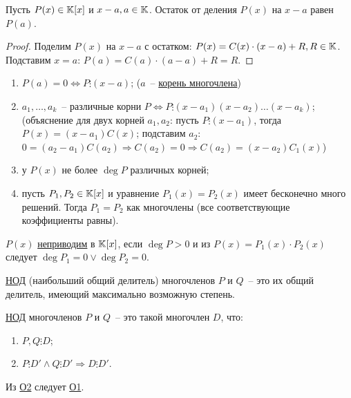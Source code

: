 \begin{theo}[Безу]
	Пусть $P(x) \in \mathbb{K}[x]$ и $x-a, a \in \mathbb{K}$. Остаток от деления $P(x)$ на $x-a$ равен $P(a)$.
\end{theo}
\begin{proof}
	Поделим $P(x)$ на $x-a$ с остатком: $P(x)=C(x) \cdot (x-a) + R, R \in \mathbb{K}$. Подставим $x=a$: $P(a)=C(a) \cdot (a-a) + R = R$.
\end{proof}
\begin{cor}
	\begin{enumerate}
		\item $P(a)=0 \Leftrightarrow P \vdots (x-a)$; ($a$~-- \underline{корень многочлена})
		\item $a_1, \ldots, a_k$~-- различные корни $P \Leftrightarrow P \vdots (x-a_{1})(x-a_{2}) \ldots (x-a_{k})$; (объяснение для двух корней $a_1, a_2$: пусть $P \vdots (x-a_1)$, тогда $P(x)=(x-a_1)C(x)$; подставим $a_2$: $0=(a_2-a_1)C(a_2) \Rightarrow C(a_2)=0 \Rightarrow C(a_2)=(x-a_2)C_1(x)$)
		\item у $P(x)$ не более $\deg P$ различных корней;
		\item пусть $P_1, P_2 \in \mathbb{K}[x]$ и уравнение $P_1(x)=P_2(x)$ имеет бесконечно много решений. Тогда $P_1=P_2$ как многочлены (все соответствующие коэффициенты равны).
	\end{enumerate}
\end{cor}

\begin{defin}
	$P(x)$ \underline{неприводим} в $\mathbb{K}[x]$, если $\deg P > 0$ и из $P(x)=P_1(x) \cdot P_2(x)$ следует $\deg P_1 = 0 \lor \deg P_2 = 0$.
\end{defin}

\label{GCD_def1}\begin{defin}[О1]
	\underline{НОД} (наибольший общий делитель) многочленов $P$ и $Q$~-- это их общий делитель, имеющий максимально возможную степень.
\end{defin}
\label{GCD_def2}\begin{defin}[О2]
\underline{НОД} многочленов $P$ и $Q$~-- это такой многочлен $D$, что:
\begin{enumerate}
	\item $P,Q \vdots D$;
	\item $P \vdots D' \land Q \vdots D' \Rightarrow D \vdots D'$.
\end{enumerate}
\end{defin}
Из \hyperref[GCD_def2]{О2} следует \hyperref[GCD_def1]{О1}.

